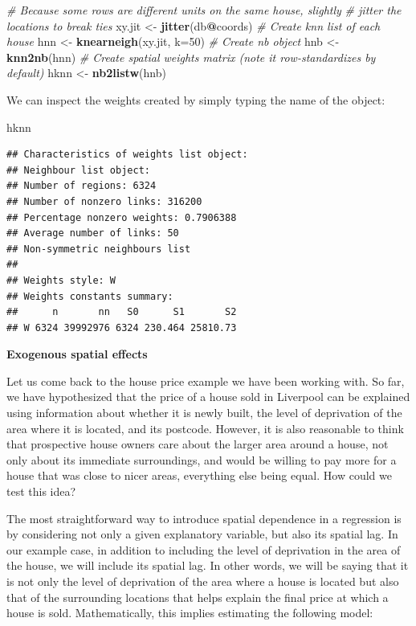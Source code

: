 \documentclass[]{book}
\newenvironment{Shaded}{\begin{snugshade}}{\end{snugshade}}
\newcommand{\KeywordTok}[1]{\textcolor[rgb]{0.13,0.29,0.53}{\textbf{#1}}}
\newcommand{\DataTypeTok}[1]{\textcolor[rgb]{0.13,0.29,0.53}{#1}}
\newcommand{\DecValTok}[1]{\textcolor[rgb]{0.00,0.00,0.81}{#1}}
\newcommand{\StringTok}[1]{\textcolor[rgb]{0.31,0.60,0.02}{#1}}
\newcommand{\CommentTok}[1]{\textcolor[rgb]{0.56,0.35,0.01}{\textit{#1}}}
\newcommand{\OperatorTok}[1]{\textcolor[rgb]{0.81,0.36,0.00}{\textbf{#1}}}
\newcommand{\NormalTok}[1]{#1}
\begin{document}
\begin{Shaded}
\begin{Highlighting}[]
\CommentTok{# Because some rows are different units on the same house, slightly}
\CommentTok{# jitter the locations to break ties}
\NormalTok{xy.jit <-}\StringTok{ }\KeywordTok{jitter}\NormalTok{(db}\OperatorTok{@}\NormalTok{coords)}
\CommentTok{# Create knn list of each house}
\NormalTok{hnn <-}\StringTok{ }\KeywordTok{knearneigh}\NormalTok{(xy.jit, }\DataTypeTok{k=}\DecValTok{50}\NormalTok{)}
\CommentTok{# Create nb object}
\NormalTok{hnb <-}\StringTok{ }\KeywordTok{knn2nb}\NormalTok{(hnn)}
\CommentTok{# Create spatial weights matrix (note it row-standardizes by default)}
\NormalTok{hknn <-}\StringTok{ }\KeywordTok{nb2listw}\NormalTok{(hnb)}
\end{Highlighting}
\end{Shaded}

We can inspect the weights created by simply typing the name of the
object:

\begin{Shaded}
\begin{Highlighting}[]
\NormalTok{hknn}
\end{Highlighting}
\end{Shaded}

\begin{verbatim}
## Characteristics of weights list object:
## Neighbour list object:
## Number of regions: 6324 
## Number of nonzero links: 316200 
## Percentage nonzero weights: 0.7906388 
## Average number of links: 50 
## Non-symmetric neighbours list
## 
## Weights style: W 
## Weights constants summary:
##      n       nn   S0      S1       S2
## W 6324 39992976 6324 230.464 25810.73
\end{verbatim}

\textbf{Exogenous spatial effects}

Let us come back to the house price example we have been working with.
So far, we have hypothesized that the price of a house sold in Liverpool
can be explained using information about whether it is newly built, the
level of deprivation of the area where it is located, and its postcode.
However, it is also reasonable to think that prospective house owners
care about the larger area around a house, not only about its immediate
surroundings, and would be willing to pay more for a house that was
close to nicer areas, everything else being equal. How could we test
this idea?

The most straightforward way to introduce spatial dependence in a
regression is by considering not only a given explanatory variable, but
also its spatial lag. In our example case, in addition to including the
level of deprivation in the area of the house, we will include its
spatial lag. In other words, we will be saying that it is not only the
level of deprivation of the area where a house is located but also that
of the surrounding locations that helps explain the final price at which
a house is sold. Mathematically, this implies estimating the following
model:
\end{document}
